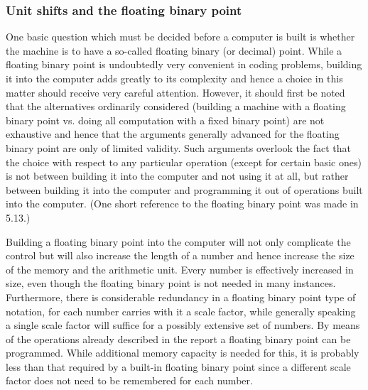\documentclass[12pt]{amsart}
\begin{document}
\subsubsection{Unit shifts and the floating binary point}
One basic question which must be decided before a computer is built is whether the machine is to have a so-called floating binary (or decimal) point. While a floating binary point is undoubtedly very convenient in coding problems, building it into the computer adds greatly to its complexity and hence a choice in this matter should receive very careful attention. However, it should first be noted that the alternatives ordinarily considered (building a machine with a floating binary point vs. doing all computation with a fixed binary point) are not exhaustive and hence that the arguments generally advanced for the floating binary point are only of limited validity. Such arguments overlook the fact that the choice with respect to any particular operation (except for certain basic ones) is not between building it into the computer and not using it at all, but rather between building it into the computer and programming it out of operations built into the computer. (One short reference to the floating binary point was made in 5.13.)

Building a floating binary point into the computer will not only complicate the control but will also increase the length of a number and hence increase the size of the memory and the arithmetic unit. Every number is effectively increased in size, even though the floating binary point is not needed in many instances. Furthermore, there is considerable redundancy in a floating binary point type of notation, for each number carries with it a scale factor, while generally speaking a single scale factor will suffice for a possibly extensive set of numbers. By means of the operations already described in the report a floating binary point can be programmed. While additional memory capacity is needed for this, it is probably less than that required by a built-in floating binary point since a different scale factor does not need to be remembered for each number.
\end{document}
